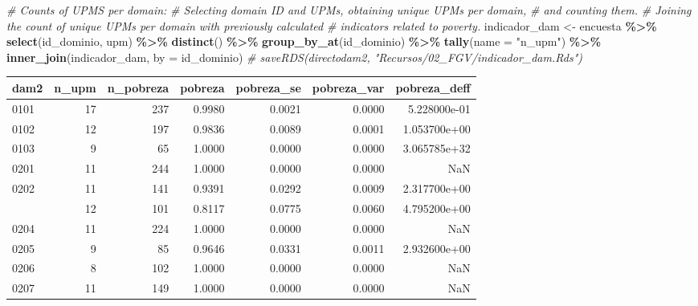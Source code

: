 \documentclass[
  12pt,
]{book}
\newenvironment{Shaded}{\begin{snugshade}}{\end{snugshade}}
\newcommand{\AttributeTok}[1]{\textcolor[rgb]{0.13,0.29,0.53}{#1}}
\newcommand{\CommentTok}[1]{\textcolor[rgb]{0.56,0.35,0.01}{\textit{#1}}}
\newcommand{\FunctionTok}[1]{\textcolor[rgb]{0.13,0.29,0.53}{\textbf{#1}}}
\newcommand{\NormalTok}[1]{#1}
\newcommand{\OtherTok}[1]{\textcolor[rgb]{0.56,0.35,0.01}{#1}}
\newcommand{\SpecialCharTok}[1]{\textcolor[rgb]{0.81,0.36,0.00}{\textbf{#1}}}
\newcommand{\StringTok}[1]{\textcolor[rgb]{0.31,0.60,0.02}{#1}}
\begin{document}
\begin{Shaded}
\begin{Highlighting}[]
\CommentTok{\# Counts of UPMS per domain:}
\CommentTok{\# Selecting domain ID and UPMs, obtaining unique UPMs per domain, }
\CommentTok{\# and counting them.}
\CommentTok{\# Joining the count of unique UPMs per domain with previously calculated }
\CommentTok{\# indicators related to poverty.}
\NormalTok{indicador\_dam }\OtherTok{\textless{}{-}}\NormalTok{ encuesta }\SpecialCharTok{\%\textgreater{}\%} \FunctionTok{select}\NormalTok{(id\_dominio, upm) }\SpecialCharTok{\%\textgreater{}\%}
  \FunctionTok{distinct}\NormalTok{() }\SpecialCharTok{\%\textgreater{}\%} 
  \FunctionTok{group\_by\_at}\NormalTok{(id\_dominio) }\SpecialCharTok{\%\textgreater{}\%} 
  \FunctionTok{tally}\NormalTok{(}\AttributeTok{name =} \StringTok{"n\_upm"}\NormalTok{) }\SpecialCharTok{\%\textgreater{}\%} 
  \FunctionTok{inner\_join}\NormalTok{(indicador\_dam, }\AttributeTok{by =}\NormalTok{ id\_dominio)}
\CommentTok{\# saveRDS(directodam2, "Recursos/02\_FGV/indicador\_dam.Rds")}
\end{Highlighting}
\end{Shaded}

\begin{table}[H]
\centering
\centering
\begin{tabular}[t]{lrrrrrr}
\toprule
dam2 & n\_upm & n\_pobreza & pobreza & pobreza\_se & pobreza\_var & pobreza\_deff\\
\midrule
0101 & 17 & 237 & 0.9980 & 0.0021 & 0.0000 & 5.228000e-01\\
0102 & 12 & 197 & 0.9836 & 0.0089 & 0.0001 & 1.053700e+00\\
0103 & 9 & 65 & 1.0000 & 0.0000 & 0.0000 & 3.065785e+32\\
0201 & 11 & 244 & 1.0000 & 0.0000 & 0.0000 & NaN\\
0202 & 11 & 141 & 0.9391 & 0.0292 & 0.0009 & 2.317700e+00\\
\addlinespace
0203 & 12 & 101 & 0.8117 & 0.0775 & 0.0060 & 4.795200e+00\\
0204 & 11 & 224 & 1.0000 & 0.0000 & 0.0000 & NaN\\
0205 & 9 & 85 & 0.9646 & 0.0331 & 0.0011 & 2.932600e+00\\
0206 & 8 & 102 & 1.0000 & 0.0000 & 0.0000 & NaN\\
0207 & 11 & 149 & 1.0000 & 0.0000 & 0.0000 & NaN\\
\bottomrule
\end{tabular}
\end{table}
\end{document}
